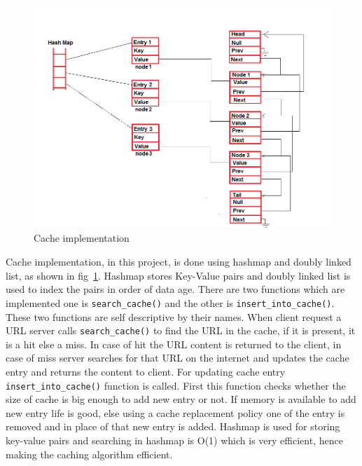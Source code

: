 \documentclass[11pt,pdftex,twocolumn]{article}
\begin{document}
\begin{figure}[!h]
\centering
\includegraphics[scale=0.35]{images/cache_impl.png}
\caption{Cache implementation}
\label{img:cache_impl}
\end{figure}
Cache implementation, in this project, is done using hashmap and doubly linked list, as shown in fig~\ref{img:cache_impl}. Hashmap stores Key-Value pairs and doubly linked list is used to index the pairs in order of data age. There are two functions which are implemented one is \texttt{search\_cache()} and the other is \texttt{insert\_into\_cache()}. These two functions are self descriptive by their names. When client request a URL server calls \texttt{search\_cache()} to find the URL in the cache, if it is present, it is a hit else a miss. In case of hit the URL content is returned to the client, in case of miss server searches for that URL on the internet and updates the cache entry and returns the content to client. For updating cache entry \texttt{insert\_into\_cache()} function is called. First this function checks whether the size of cache is big enough to add new entry or not. If memory is available to add new entry life is good, else using a cache replacement policy one of the entry is removed and in place of that new entry is added. Hashmap is used for storing key-value pairs and searching in hashmap is O(1) which is very efficient, hence making the caching algorithm efficient.
\end{document}
